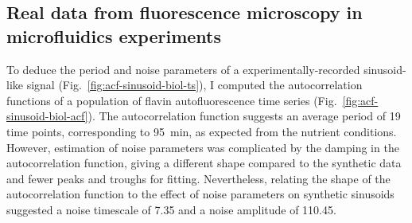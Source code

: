\subsection{Real data from fluorescence microscopy in microfluidics experiments}
\label{subsubsec:analysis-characterisation-real}

To deduce the period and noise parameters of a experimentally-recorded sinusoid-like signal (Fig.\ \ref{fig:acf-sinusoid-biol-ts}), I computed the autocorrelation functions of a population of flavin autofluorescence time series (Fig.\ \ref{fig:acf-sinusoid-biol-acf}).
The autocorrelation function suggests an average period of 19 time points, corresponding to \SI{95}{\minute}, as expected from the nutrient conditions.
However, estimation of noise parameters was complicated by the damping in the autocorrelation function, giving a different shape compared to the synthetic data and fewer peaks and troughs for fitting.
Nevertheless, relating the shape of the autocorrelation function to the effect of noise parameters on synthetic sinusoids suggested a noise timescale of 7.35 and a noise amplitude of 110.45.

